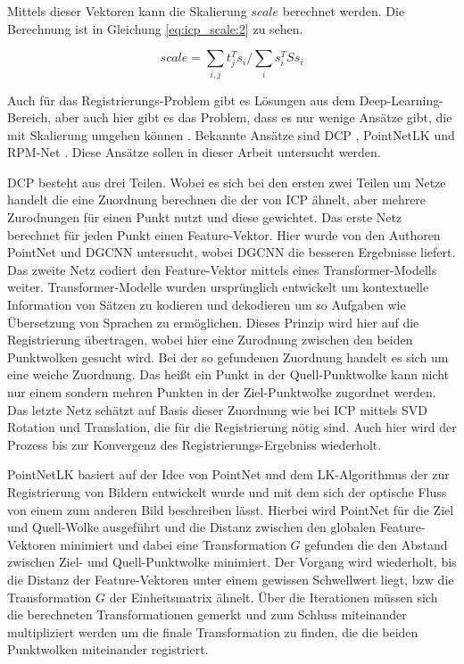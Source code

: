 \documentclass[12pt,titlepage, twoside]{article}
\begin{document}
Mittels dieser Vektoren kann die Skalierung $scale$ berechnet werden. Die Berechnung ist in Gleichung \ref{eq:icp_scale:2} zu sehen.

\begin{equation}
    \label{eq:icp_scale:2}
    scale = \sum_{i,j}{t_j^Ts_i} / \sum_{i}{s_i^TSs_i}
\end{equation}

Auch für das Registrierungs-Problem gibt es Lösungen aus dem Deep-Learning-Bereich, aber auch hier gibt es das Problem, dass es nur wenige Ansätze gibt, die mit Skalierung umgehen können \cite{ScaleLK}.
Bekannte Ansätze sind DCP \cite{Wang_2019_ICCV}, PointNetLK \cite{aoki2019pointnetlk} und RPM-Net \cite{Yew_2020}.
Diese Ansätze sollen in dieser Arbeit untersucht werden.

DCP besteht aus drei Teilen. Wobei es sich bei den ersten zwei Teilen um Netze handelt die eine Zuordnung berechnen die der von ICP ähnelt, aber mehrere Zurodnungen für einen Punkt nutzt und diese gewichtet.
Das erste Netz berechnet für jeden Punkt einen Feature-Vektor. Hier wurde von den Authoren PointNet und DGCNN untersucht, wobei DGCNN die besseren Ergebnisse liefert. 
Das zweite Netz codiert den Feature-Vektor mittels eines Transformer-Modells weiter. 
Transformer-Modelle wurden ursprünglich entwickelt um kontextuelle Information von Sätzen zu kodieren und dekodieren um so Aufgaben wie Übersetzung von Sprachen zu ermöglichen. 
Dieses Prinzip wird hier auf die Registrierung übertragen, wobei hier eine Zurodnung zwischen den beiden Punktwolken gesucht wird.
Bei der so gefundenen Zuordnung handelt es sich um eine weiche Zuordnung. Das heißt ein Punkt in der Quell-Punktwolke kann nicht nur einem sondern mehren Punkten in der Ziel-Punktwolke zugordnet werden.
Das letzte Netz schätzt auf Basis dieser Zuordnung wie bei ICP mittels SVD Rotation und Translation, die für die Registrierung nötig sind.
Auch hier wird der Prozess bis zur Konvergenz des Registrierungs-Ergebniss wiederholt.

PointNetLK basiert auf der Idee von PointNet und dem LK-Algorithmus \cite{lk} der zur Registrierung von Bildern entwickelt wurde und mit dem sich der optische Fluss von einem zum anderen Bild beschreiben lässt. 
Hierbei wird PointNet für die Ziel und Quell-Wolke ausgeführt und die Distanz zwischen den globalen Feature-Vektoren minimiert und 
dabei eine Transformation $G$ gefunden die den Abstand zwischen Ziel- und Quell-Punktwolke minimiert.
Der Vorgang wird wiederholt, bis die Distanz der Feature-Vektoren unter einem gewissen Schwellwert liegt, bzw die Transformation $G$ der Einheitsmatrix ähnelt.
Über die Iterationen müssen sich die berechneten Transformationen gemerkt und zum Schluss miteinander multipliziert werden um die finale Transformation zu finden, die die beiden Punktwolken miteinander registriert.
\end{document}
